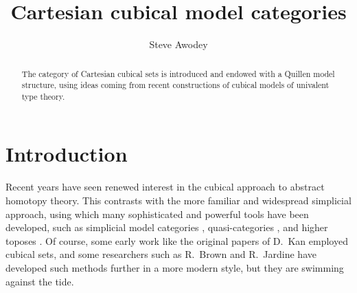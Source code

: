 \documentclass[11pt]{amsart}
\theoremstyle{remark}
\theoremstyle{definition}
\begin{document}

\title{Cartesian cubical model categories}
\author{Steve Awodey}
\maketitle

\begin{abstract}
\noindent The category of Cartesian cubical sets is introduced and endowed with a Quillen model structure, 
using ideas coming from recent constructions of cubical models of univalent type theory.
\end{abstract}

\setcounter{tocdepth}{1}
\tableofcontents

\section*{Introduction}

Recent years have seen renewed interest in the cubical approach to abstract homotopy theory.  This contrasts with the more familiar and widespread simplicial approach, using which many sophisticated and powerful tools have been developed, such as simplicial model categories \cite{DwyerKan:1980sl}, quasi-categories \cite{Joyal:2008tq}, and higher toposes \cite{Lurie:2009ht}.  Of course, some early work like the original papers of D.\ Kan \cite{DK50,DK51} employed cubical sets, and some researchers such as R.\ Brown \cite{Brown} and R.\ Jardine \cite{Jardine} have developed such methods further in a more modern style, but they are swimming against the tide.  
\end{document}

